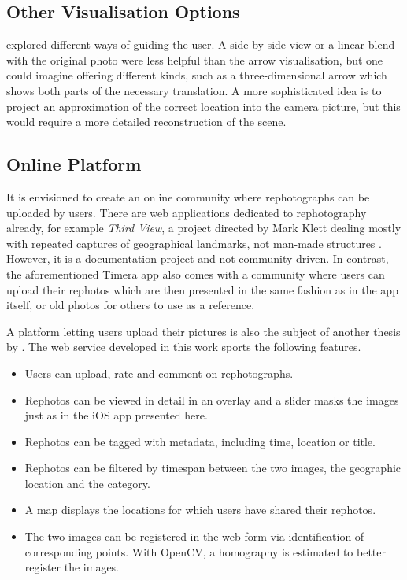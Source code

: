 \subsection*{Other Visualisation Options}\label{subsec:alternative_visualisation}

\citet{bae2010} explored different ways of guiding the user.  A side-by-side
view or a linear blend with the original photo were less helpful than the arrow
visualisation, but one could imagine offering different kinds, such as a
three-dimensional arrow which shows both parts of the necessary translation. A
more sophisticated idea is to project an approximation of the correct location
into the camera picture, but this would require a more detailed reconstruction
of the scene.

\subsection*{Online Platform}

It is envisioned to create an online community where
rephotographs can be uploaded by users.  There are web applications dedicated to
rephotography already, for example \emph{Third View}, a project directed by Mark
Klett dealing mostly with repeated captures of geographical landmarks, not
man-made structures \citep{thirdview}. However, it is a documentation project
and not community-driven. In contrast, the aforementioned Timera app also comes
with a community where users can upload their rephotos which are then presented
in the same fashion as in the app itself, or old photos for others to use as a
reference.

A platform letting users upload their pictures is also the subject of another
thesis by \citet{weber2015}. The web service developed in this work sports the
following features.

\begin{itemize}
   \item Users can upload, rate and comment on rephotographs.
   \item Rephotos can be viewed in detail in an overlay and a slider masks the
      images just as in the iOS app presented here.
    \item Rephotos can be tagged with metadata, including time, location or
       title.
    \item Rephotos can be filtered by timespan between the two images, the
       geographic location and the category.
    \item A map displays the locations for which users have shared their
       rephotos.
    \item The two images can be registered in the web form via identification of
       corresponding points. With OpenCV, a homography is estimated to better
       register the images.
\end{itemize}

